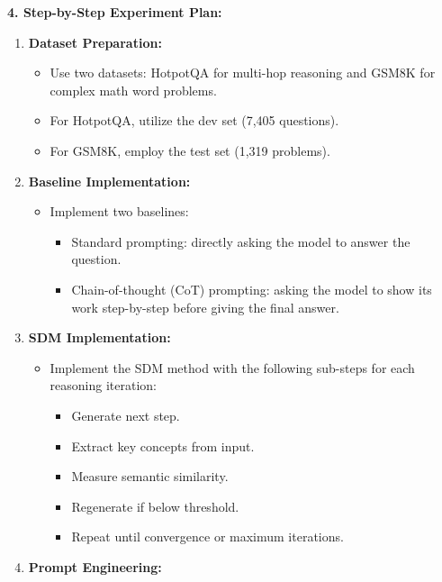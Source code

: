 \begin{tcolorbox}[colback=blue!5!white,colframe=blue!75!black,title=\textbf{Semantic Divergence Minimization: Reducing Hallucinations in Large Language Models
through Iterative Concept Grounding (Part 2)}]
\small{
\textbf{4. Step-by-Step Experiment Plan:}
\begin{enumerate}
    \item \textbf{Dataset Preparation:}
    \begin{itemize}
        \item Use two datasets: HotpotQA for multi-hop reasoning and GSM8K for complex math word problems.
        \item For HotpotQA, utilize the dev set (7,405 questions).
        \item For GSM8K, employ the test set (1,319 problems).
    \end{itemize}
    \item \textbf{Baseline Implementation:}
    \begin{itemize}
        \item Implement two baselines:
        \begin{itemize}
            \item Standard prompting: directly asking the model to answer the question.
            \item Chain-of-thought (CoT) prompting: asking the model to show its work step-by-step before giving the final answer.
        \end{itemize}
    \end{itemize}
    \item \textbf{SDM Implementation:}
    \begin{itemize}
        \item Implement the SDM method with the following sub-steps for each reasoning iteration:
        \begin{itemize}
            \item Generate next step.
            \item Extract key concepts from input.
            \item Measure semantic similarity.
            \item Regenerate if below threshold.
            \item Repeat until convergence or maximum iterations.
        \end{itemize}
    \end{itemize}
    \item \textbf{Prompt Engineering:}

\end{enumerate}}
\end{tcolorbox}
